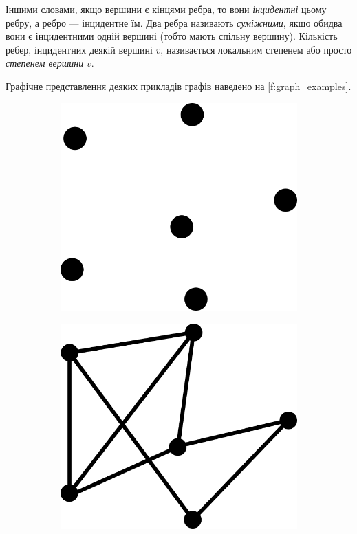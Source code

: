 Іншими словами, якщо вершини є кінцями ребра, то вони \emph{інцидентні} цьому ребру, а ребро ---
інцидентне їм. Два ребра називають \emph{суміжними}, якщо обидва вони є інцидентними одній вершині
(тобто мають спільну вершину). Кількість ребер, інцидентних деякій вершині $v$, називається
локальним степенем або просто \emph{степенем вершини} $v$.

Графічне представлення деяких прикладів графів наведено на \ref{f:graph_examples}.

\begin{figure}[!ht]
  \begin{subfigure}{.25\textwidth}
    \centering
    \includegraphics[width=.8\linewidth]{images/lab3/graph_sample_1.png}
    \caption{}
    \label{f:graph_sample_1}
  \end{subfigure}
  \begin{subfigure}{.25\textwidth}
    \centering
    \includegraphics[width=.8\linewidth]{images/lab3/graph_sample_2.png}

\end{subfigure}
\end{figure}
